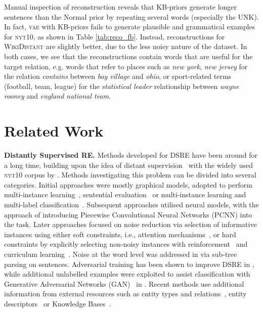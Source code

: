 \documentclass[11pt]{article}
\begin{document}
Manual inspection of reconstruction reveals that KB-priors generate longer sentences than the Normal prior by repeating several words (especially the UNK). 
In fact, \textsc{vae} with KB-priors fails to generate plausible and grammatical examples for \textsc{nyt10}, as shown in Table \ref{tab:reco_fb}. 
Instead, reconstructions for \textsc{WikiDistant} are slightly better, due to the less noisy nature of the dataset.
In both cases, we see that the reconstructions contain words that are useful for the target relation, e.g. words that refer to places such as \textit{new york}, \textit{new jersey} for the relation \textit{contains} between \textit{bay village} and \textit{ohio}, or sport-related terms (football, team, league) for the \textit{statistical leader} relationship between \textit{wayne rooney} and \textit{england national team}.






\section{Related Work}

\textbf{Distantly Supervised RE.} 
Methods developed for DSRE have been around for a long time, building upon the idea of distant supervision~\citep{mintz2009distant} with the widely used \textsc{nyt10} corpus by \citet{riedel2010modeling}. 
Methods investigating this problem can be divided into several categories. Initial approaches were mostly graphical models, adopted to perform multi-instance learning~\citep{riedel2010modeling}, sentential evaluation~\citep{hoffmann2011knowledge,bai2019structured} or multi-instance learning and multi-label classification~\citep{surdeanu2012multi}. 
Subsequent approaches utilised neural models, with the approach of \citet{zeng2015distant} introducing Piecewise Convolutional Neural Networks (PCNN) into the task.  
Later approaches focused on noise reduction via selection of informative instances using either soft constraints, i.e., attention mechanisms~\citep{lin2016neural,ye2019intra-inter,yuan2019cross}, or hard constraints by explicitly selecting non-noisy instances with reinforcement~\citep{feng2018reinforcement,qin2018robust,qin2018dsgan,wu2019improving,yang2019exploiting} and curriculum learning~\citep{du2019curriculum}.
Noise at the word level was addressed in \citet{liu2018neural} via sub-tree parsing on sentences.
Adversarial training has been shown to improve DSRE in \citet{wu2017adversarial}, while additional unlabelled examples were exploited to assist classification with Generative Adversarial Networks (GAN)~\citep{goodfellow2014generative} in \citet{li2019gan}.
Recent methods use additional information from external resources such as entity types and relations~\citep{vashishth2018reside}, entity descriptors~\citep{ji2017descriptors,she2018descriptions,hu2019improving} or Knowledge Bases~\citep{weston2013connecting,xu2019hrere,li2020self}. \\
\end{document}

